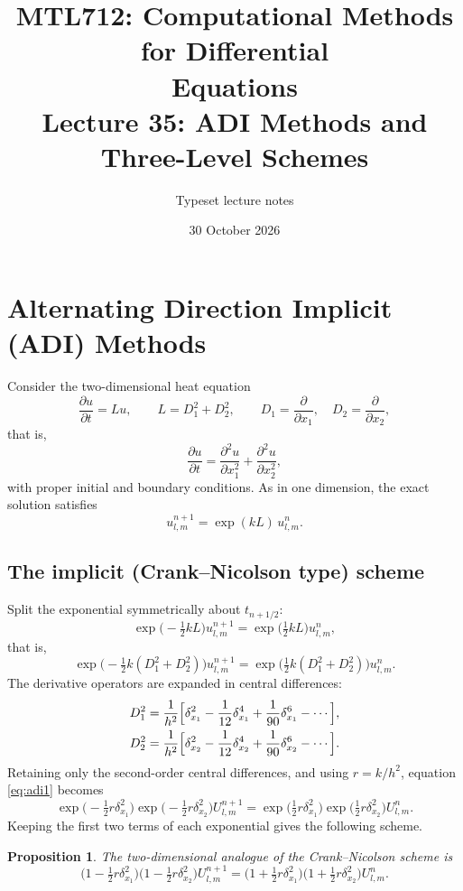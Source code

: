 \documentclass[11pt,a4paper]{article}
\title{\textbf{MTL712: Computational Methods for Differential\\Equations}\\[6pt]
\large Lecture 35: ADI Methods and Three-Level Schemes}
\author{\normalsize Typeset lecture notes}
\date{\normalsize 30 October 2026}
\numberwithin{equation}{section}
\theoremstyle{spacedplain}
\newtheorem{proposition}[theorem]{Proposition}
\theoremstyle{spaceddefinition}
\theoremstyle{spacedremark}
\newcommand{\pd}[2]{\frac{\partial #1}{\partial #2}}
\newcommand{\pdd}[2]{\frac{\partial^2 #1}{\partial #2^2}}
\begin{document}
\maketitle
\thispagestyle{plain}
{\linespread{1.0}\selectfont\setlength{\parskip}{0pt}\tableofcontents}

\section{Alternating Direction Implicit (ADI) Methods}

Consider the two-dimensional heat equation
\[
  \pd ut=Lu,
  \qquad
  L=D_1^2+D_2^2,
  \qquad
  D_1=\pd{}{x_1},\quad D_2=\pd{}{x_2},
\]
that is,
\[
  \pd ut=\pdd u{x_1}+\pdd u{x_2},
\]
with proper initial and boundary conditions.  As in one dimension, the
exact solution satisfies
\[
  u_{l,m}^{n+1}=\exp(kL)\,u_{l,m}^n .
\]

\subsection{The implicit (Crank--Nicolson type) scheme}

Split the exponential symmetrically about \(t_{n+1/2}\):
\[
  \exp\bigl(-\tfrac12kL\bigr)u_{l,m}^{n+1}
  =\exp\bigl(\tfrac12kL\bigr)u_{l,m}^n,
\]
that is,
\begin{equation}\label{eq:adi1}
  \exp\bigl(-\tfrac12k(D_1^2+D_2^2)\bigr)u_{l,m}^{n+1}
  =\exp\bigl(\tfrac12k(D_1^2+D_2^2)\bigr)u_{l,m}^n .
\end{equation}
The derivative operators are expanded in central differences:
\begin{align*}
  D_1^2&=\frac1{h^2}\Bigl[\delta_{x_1}^2-\frac1{12}\delta_{x_1}^4
         +\frac1{90}\delta_{x_1}^6-\cdots\Bigr],\\
  D_2^2&=\frac1{h^2}\Bigl[\delta_{x_2}^2-\frac1{12}\delta_{x_2}^4
         +\frac1{90}\delta_{x_2}^6-\cdots\Bigr].
\end{align*}
Retaining only the second-order central differences, and using
\(r=k/h^2\), equation \eqref{eq:adi1} becomes
\[
  \exp\bigl(-\tfrac12r\delta_{x_1}^2\bigr)
  \exp\bigl(-\tfrac12r\delta_{x_2}^2\bigr)U_{l,m}^{n+1}
  =\exp\bigl(\tfrac12r\delta_{x_1}^2\bigr)
   \exp\bigl(\tfrac12r\delta_{x_2}^2\bigr)U_{l,m}^n .
\]
Keeping the first two terms of each exponential gives the following
scheme.

\begin{keybox}
\begin{proposition}\label{prop:adi}
The two-dimensional analogue of the Crank--Nicolson scheme is
\begin{equation}\label{eq:adi2}
  \bigl(1-\tfrac12r\delta_{x_1}^2\bigr)
  \bigl(1-\tfrac12r\delta_{x_2}^2\bigr)U_{l,m}^{n+1}
  =\bigl(1+\tfrac12r\delta_{x_1}^2\bigr)
   \bigl(1+\tfrac12r\delta_{x_2}^2\bigr)U_{l,m}^n .
\end{equation}
\end{proposition}
\end{keybox}
\end{document}
